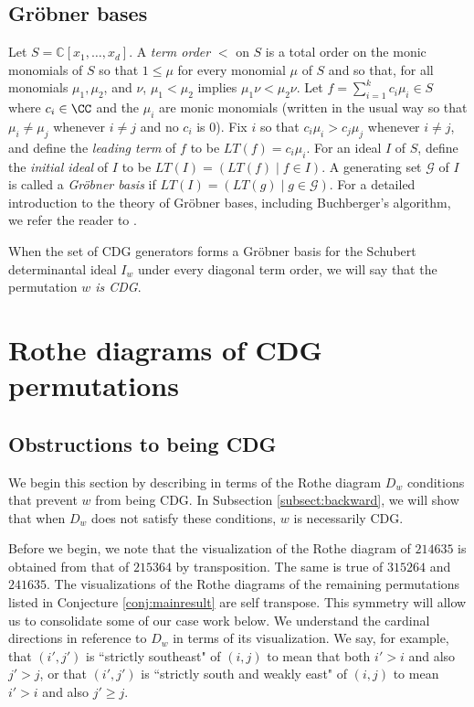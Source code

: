 \subsection{Gr\"obner bases}\label{subsect:Grobner}

Let $S=\mathbb{C}[x_1, \ldots, x_d]$.  A \emph{term order} $<$ on $S$ is a total order on the monic monomials of $S$ so that $1 \leq \mu$ for every monomial $\mu$ of $S$ and so that, for all monomials $\mu_1, \mu_2$, and $\nu$, $\mu_1<\mu_2$ implies $\mu_1 \nu < \mu_2 \nu$.  Let $f = \sum_{i=1}^k c_i \mu_i \in S$ where $c_i \in \CC$ and the $\mu_i$ are monic monomials (written in the usual way so that $\mu_i \neq \mu_j$ whenever $i \neq j$ and no $c_i$ is  $0$).  Fix $i$ so that $c_i \mu_i >c_j \mu_j$ whenever $i \neq j$, and define the \emph{leading term} of $f$ to be $LT(f)=c_i \mu_i$.  For an ideal $I$ of $S$, define the \emph{initial ideal} of $I$ to be $LT(I) = (LT(f) \mid f \in I)$.  A generating set $\mathcal{G}$ of $I$ is called a \emph{Gr\"obner basis} if $LT(I) = (LT(g) \mid g \in \mathcal{G})$.  For a detailed introduction to the theory of Gr\"obner bases, including Buchberger's algorithm, we refer the reader to \cite[Chapter 15]{Eis95}.

\begin{definition}
When the set of CDG generators forms a Gr\"obner basis for the Schubert determinantal ideal $I_w$ under every diagonal term order, we will say that the permutation \emph{$w$ is CDG}.  
\end{definition}

\section{Rothe diagrams of CDG permutations}\label{sect:backward}

\subsection{Obstructions to being CDG}

We begin this section by describing in terms of the Rothe diagram $D_w$ conditions that prevent $w$ from being CDG.  In Subsection \ref{subsect:backward}, we will show that when $D_w$ does not satisfy these conditions, $w$ is necessarily CDG.

Before we begin, we note that the visualization of the Rothe diagram of $214635$ is obtained from that of $215364$ by transposition.  The same is true of $315264$ and $241635$.  The visualizations of the Rothe diagrams of the remaining permutations listed in Conjecture \ref{conj:mainresult} are self transpose.   This symmetry will allow us to consolidate some of our case work below.  We understand the cardinal directions in reference to $D_w$ in terms of its visualization.  We say, for example, that $(i',j')$ is ``strictly southeast" of $(i,j)$ to mean that both $i'>i$ and also $j'>j$, or that $(i',j')$ is ``strictly south and weakly east" of $(i,j)$ to mean $i'>i$ and also $j' \geq j$.

